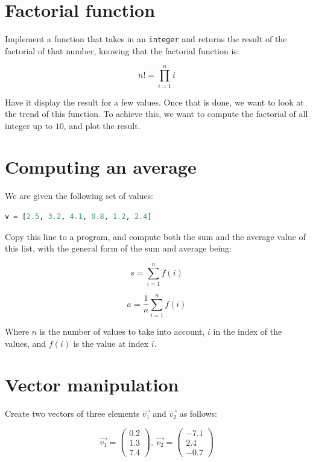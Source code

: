 \documentclass[twocolumn]{article}
\begin{document}
\section{Factorial function}\label{sec:factorial}

Implement a function that takes in an \verb|integer| and returns the result of the factorial of that number, knowing that the factorial function is:

\begin{equation}\label{eq:factorial}
    n! = \prod_{i=1}^n i
\end{equation}

Have it display the result for a few values. Once that is done, we want to look at the trend of this function. To achieve this, we want to compute the factorial of all integer up to $10$, and plot the result.

\section{Computing an average}\label{sec:average}

We are given the following set of values:

\begin{lstlisting}[language=Python]
v = [2.5, 3.2, 4.1, 0.8, 1.2, 2.4]
\end{lstlisting}

Copy this line to a program, and compute both the sum and the average value of this list, with the general form of the sum and average being:

\begin{equation}
    s = \sum_{i=1}^{n} f(i)
\end{equation}

\begin{equation}\label{eq:average}
    a = \frac{1}{n}\sum_{i=1}^{n} f(i)
\end{equation}

Where $n$ is the number of values to take into account, $i$ in the index of the values, and $f(i)$ is the value at index $i$.

\section{Vector manipulation}\label{sec:vector_manip}

Create two vectors of three elements $\Vec{v_1}$ and $\Vec{v_2}$ as follows:

\begin{equation}
    \overrightarrow{v_1}=\begin{pmatrix}
        0.2\\
        1.3\\
        7.4
    \end{pmatrix},~\overrightarrow{v_2}=\begin{pmatrix}
        -7.1\\
        2.4\\
        -0.7
    \end{pmatrix}
\end{equation}
\end{document}
